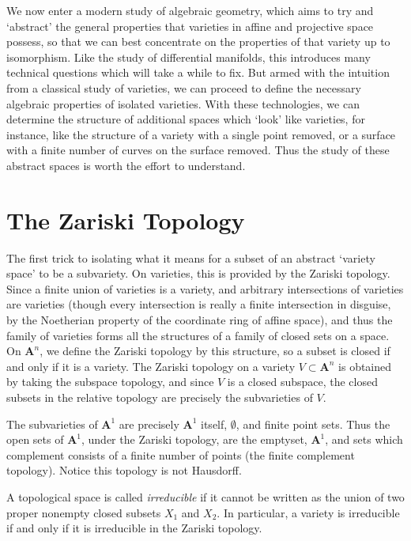 We now enter a modern study of algebraic geometry, which aims to try and `abstract' the general properties that varieties in affine and projective space possess, so that we can best concentrate on the properties of that variety up to isomorphism. Like the study of differential manifolds, this introduces many technical questions which will take a while to fix. But armed with the intuition from a classical study of varieties, we can proceed to define the necessary algebraic properties of isolated varieties. With these technologies, we can determine the structure of additional spaces which `look' like varieties, for instance, like the structure of a variety with a single point removed, or a surface with a finite number of curves on the surface removed. Thus the study of these abstract spaces is worth the effort to understand.

\section{The Zariski Topology}

The first trick to isolating what it means for a subset of an abstract `variety space' to be a subvariety. On varieties, this is provided by the Zariski topology. Since a finite union of varieties is a variety, and arbitrary intersections of varieties are varieties (though every intersection is really a finite intersection in disguise, by the Noetherian property of the coordinate ring of affine space), and thus the family of varieties forms all the structures of a family of closed sets on a space. On $\mathbf{A}^n$, we define the Zariski topology by this structure, so a subset is closed if and only if it is a variety. The Zariski topology on a variety $V \subset \mathbf{A}^n$ is obtained by taking the subspace topology, and since $V$ is a closed subspace, the closed subsets in the relative topology are precisely the subvarieties of $V$.

\begin{example}
    The subvarieties of $\mathbf{A}^1$ are precisely $\mathbf{A}^1$ itself, $\emptyset$, and finite point sets. Thus the open sets of $\mathbf{A}^1$, under the Zariski topology, are the emptyset, $\mathbf{A}^1$, and sets which complement consists of a finite number of points (the finite complement topology). Notice this topology is not Hausdorff.
\end{example}

A topological space is called \emph{irreducible} if it cannot be written as the union of two proper nonempty closed subsets $X_1$ and $X_2$. In particular, a variety is irreducible if and only if it is irreducible in the Zariski topology.

